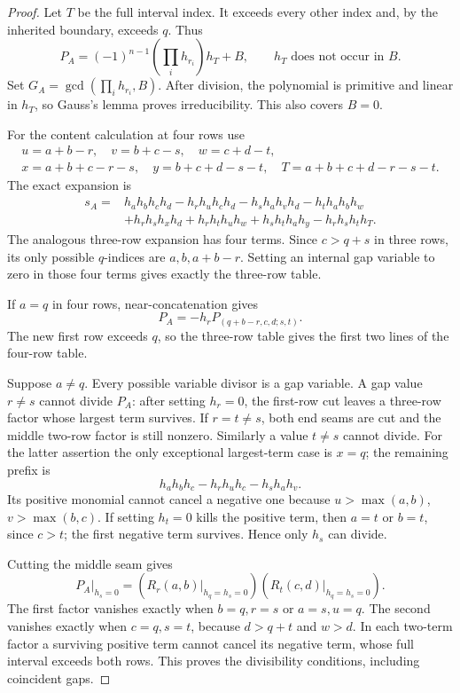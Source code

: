 \documentclass[11pt,a4paper]{amsart}
\numberwithin{equation}{section}
\theoremstyle{plain}
\theoremstyle{definition}
\begin{document}
\begin{proof}
Let \(T\) be the full interval index.  It exceeds every other index and,
by the inherited boundary, exceeds \(q\).  Thus
\[
 P_A=(-1)^{n-1}\left(\prod_i h_{r_i}\right)h_T+B,
 \qquad h_T\text{ does not occur in }B.
\]
Set \(G_A=\gcd(\prod_i h_{r_i},B)\).  After division, the polynomial is
primitive and linear in \(h_T\), so Gauss's lemma proves irreducibility.
This also covers \(B=0\).

For the content calculation at four rows use
\begin{gather*}
 u=a+b-r,\quad v=b+c-s,\quad w=c+d-t,\\
 x=a+b+c-r-s,\quad y=b+c+d-s-t,\quad
 T=a+b+c+d-r-s-t.
\end{gather*}
The exact expansion is
\begin{equation}\label{eq:staircase-four-expansion}
\begin{aligned}
 s_A={}&h_ah_bh_ch_d-h_rh_uh_ch_d-h_sh_ah_vh_d-h_th_ah_bh_w\\
 &+h_rh_sh_xh_d+h_rh_th_uh_w+h_sh_th_ah_y-h_rh_sh_th_T.
\end{aligned}
\end{equation}
The analogous three-row expansion has four terms.  Since
\(c>q+s\) in three rows, its only possible \(q\)-indices are
\(a,b,a+b-r\).  Setting an internal gap variable to zero in those four
terms gives exactly the three-row table.

If \(a=q\) in four rows, near-concatenation gives
\[
 P_A=-h_rP_{(q+b-r,c,d;s,t)}.
\]
The new first row exceeds \(q\), so the three-row table gives the first
two lines of the four-row table.

Suppose \(a\ne q\).  Every possible variable divisor is a gap variable.
A gap value \(r\ne s\) cannot divide \(P_A\): after setting \(h_r=0\),
the first-row cut leaves a three-row factor whose largest term survives.
If \(r=t\ne s\), both end seams are cut and the middle two-row factor
is still nonzero.  Similarly a value \(t\ne s\) cannot divide.
For the latter assertion the only exceptional largest-term case is
\(x=q\); the remaining prefix is
\[
 h_ah_bh_c-h_rh_uh_c-h_sh_ah_v.
\]
Its positive monomial cannot cancel a negative one because
\(u>\max(a,b)\), \(v>\max(b,c)\).  If setting \(h_t=0\) kills the
positive term, then \(a=t\) or \(b=t\), since \(c>t\); the first
negative term survives.  Hence only \(h_s\) can divide.

Cutting the middle seam gives
\[
 P_A\big|_{h_s=0}
 =\left(R_r(a,b)\big|_{h_q=h_s=0}\right)
  \left(R_t(c,d)\big|_{h_q=h_s=0}\right).
\]
The first factor vanishes exactly when \(b=q,r=s\) or \(a=s,u=q\).
The second vanishes exactly when \(c=q,s=t\), because
\(d>q+t\) and \(w>d\).  In each two-term factor a surviving positive
term cannot cancel its negative term, whose full interval exceeds both
rows.  This proves the divisibility conditions, including coincident gaps.


\end{proof}
\end{document}
